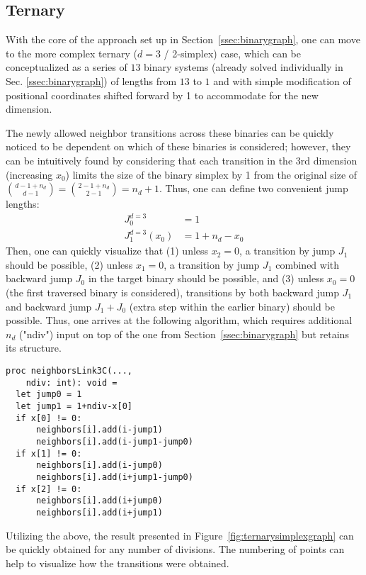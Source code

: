 \subsection{Ternary} \label{ssec:ternarygraph}

With the core of the approach set up in Section~\ref{ssec:binarygraph}, one can move to the more complex ternary ($d=3$  / 2-simplex) case, which can be conceptualized as a series of $13$ binary systems (already solved individually in Sec. \ref{ssec:binarygraph}) of lengths from $13$ to $1$ and with simple modification of positional coordinates shifted forward by 1 to accommodate for the new dimension. 

The newly allowed neighbor transitions across these binaries can be quickly noticed to be dependent on which of these binaries is considered; however, they can be intuitively found by considering that each transition in the 3rd dimension (increasing $x_0$) limits the size of the binary simplex by 1 from the original size of $\binom{d-1+n_d}{d-1} = \binom{2-1+n_d}{2-1} = n_d+1$. Thus, one can define two convenient jump lengths:
\[
\begin{aligned}
    J_0^{d=3} &= 1\\
    J_1^{d=3}(x_0) &= 1 + n_d - x_0
\end{aligned}
\]
Then, one can quickly visualize that (1) unless $x_2=0$, a transition by jump $J_1$ should be possible, (2) unless $x_1=0$, a transition by jump $J_1$ combined with backward jump $J_0$ in the target binary should be possible, and (3) unless $x_0=0$ (the first traversed binary is considered), transitions by both backward jump $J_1$ and backward jump $J_1+J_0$ (extra step within the earlier binary) should be possible. Thus, one arrives at the following algorithm, which requires additional $n_d$ ("ndiv") input on top of the one from Section~\ref{ssec:binarygraph} but retains its structure.

\begin{verbatim}
proc neighborsLink3C(...,
    ndiv: int): void =
  let jump0 = 1
  let jump1 = 1+ndiv-x[0]
  if x[0] != 0:
      neighbors[i].add(i-jump1)
      neighbors[i].add(i-jump1-jump0)
  if x[1] != 0:
      neighbors[i].add(i-jump0)
      neighbors[i].add(i+jump1-jump0)
  if x[2] != 0:
      neighbors[i].add(i+jump0)
      neighbors[i].add(i+jump1)
\end{verbatim}

Utilizing the above, the result presented in Figure~\ref{fig:ternarysimplexgraph} can be quickly obtained for any number of divisions. The numbering of points can help to visualize how the transitions were obtained.

